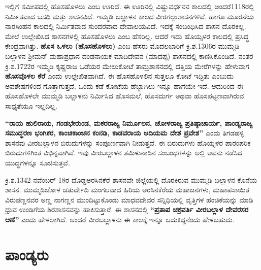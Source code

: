 ಇಲ್ಲಿಗೆ ಸಮೀಪದಲ್ಲಿ ಹೊಸಹೊಳಲು ಎಂಬ ಊರಿದೆ. ಈ ಊರಿನಲ್ಲಿ ವಿಷ್ಣುವರ್ಧನನ ಕಾಲದಲ್ಲಿ ಅಂದರೆ1118ರಲ್ಲಿ ನಿರ್ಮಿತವಾದ ಬಸದಿ ಮತ್ತು ಶಾಸನವಿದೆ. ಇಮ್ಮಡಿ ಬಲ್ಲಾಳನ ಕಾಲದ ವೀರಗಲ್ಲುಶಾಸನಗಳಿವೆ. ಹಾಗೂ ಮೂರನೆಯ ನಾರಸಿಂಹನ ಕಾಲದಲ್ಲಿ ನಿರ್ಮಿತವಾದ ಸುಂದರವಾದ ದೇವಾಲಯವಿದೆ. ಇದಕ್ಕೆ ಸಂಬಂಧಿಸಿದ ಶಾಸನ ದೊರಕಿಲ್ಲ. ಮೇಲೆ ಉಲ್ಲೇಖಿಸಿದ ಶಾಸನಗಳಲ್ಲಿ ಹೊಸಹೊಳಲು ಎಂಬ ಹೆಸರಿಲ್ಲ. ಆದರೆ ಇದು ಹೊಯ್ಸಳರ ಕಾಲದಲ್ಲಿ ಪ್ರಸಿದ್ಧ ಕೇಂದ್ರವಾಗಿತ್ತು. \textbf{ಹೊಸ ಒಳಲು (ಹೊಸಹೊಳಲು)} ಎಂಬ ಹೆಸರು ಮೊದಲಬಾರಿಗೆ ಕ್ರಿ.ಶ.1306ರ ಮುಮ್ಮಡಿ ಬಲ್ಲಾಳನ ಶ‍್ರೀಮನ್​ ಮಹಾಪ್ರಧಾನ ದಂಡನಾಯಕ ಮಾದಿದೇವನ (ಮಾದಪ್ಪ) ಶಾಸನದಲ್ಲಿ ಕಾಣಿಸಿಕೊಂಡಿದೆ. ನಂತರ ಕ್ರಿ.ಶ.1722ರ ಇಮ್ಮಡಿ ಕೃಷ್ಣರಾಜ ಒಡೆಯರ ಮೇಲುಕೋಟೆ ತಾಮ್ರಶಾಸನದಲ್ಲಿ ದತ್ತಿಯ ಮೇರೆಗಳನ್ನು ಹೇಳುವಾಗ \textbf{ಹೊಸವೊಳಲ ಕೆರೆ} ಎಂದು ಉಲ್ಲೇಖಿತವಾಗಿದೆ. ಈ ಹೊಸಹೊಳಲಿನ ಸುತ್ತಲೂ ಕೋಟೆ ಇದ್ದಿತು ಎಂಬುದು ಅವಶೇಷಗಳಿಂದ ಗೊತ್ತಾಗುತ್ತದೆ. ಒಂದು ಕಡೆ ಕೋಟೆಯ ಹೆಬ್ಬಾಗಿಲು ಇನ್ನೂ ಹಾಗೆಯೇ ಇದೆ. ಆದುರಿಂದ ಈ ಹೊಸಹೊಳಲೇ ಮುಮ್ಮಡಿ ಬಲ್ಲಾಳನು ನಿರ್ಮಿಸಿದ ಹೊಸಮಲೆ, ಹೊಸದುರ್ಗ ಅಥವಾ ಹೊಸಪಟ್ಟಣವಾಗಿರುವ ಸಾಧ್ಯತೆಯೂ ಇಲ್ಲದಿಲ್ಲ.

\textbf{“ರಾಯ ಹುಲಿರಾಯ, ಗಂಡಭೇರುಂಡ, ಮಕರರಾಜ್ಯ ನಿರ್ಮೂಲನ, ಚೋಳರಾಜ್ಯ ಪ್ರತಿಷ್ಠಾಚಾರ್ಯ,\general{\break } ಪಾಂಡ್ಯರಾಜ್ಯ ಸಮುದ್ಧರಣ ಭಂಗಿಕರ, ಕಾಂಚಿಕಾಂಚನ ಕಂನಡಿ, ಕಾಡವರಾಯ ಆದಿಯಮ ದೇಶ ಪ್ರವೇಶ”} ಎಂದು ತಿಗಡಹಳ್ಳಿ ಶಾಸನವು ವೀರಬಲ್ಲಾಳನ ಬಿರುದುಗಳನ್ನು ಸಂಪೂರ್ಣವಾಗಿ ನೀಡುತ್ತದೆ. ಈ ಬಿರುದುಗಳು ಹೊಯ್ಸಳರ ಪಾರಂಪರಿಕ ಬಿರುದುಗಳಿಗಿಂತ ವಿಭಿನ್ನವಾಗಿವೆ. ಇವು ವೀರಬಲ್ಲಾಳನ ತಮಿಳುನಾಡಿನ ಸಂಬಂಧಗಳನ್ನು ಅಲ್ಲಿ ಅವನು ನಡೆಸಿದ ಯುದ್ಧಗಳನ್ನೂ ಸೂಚಿಸುತ್ತವೆ.

ಕ್ರಿ.ಶ.1342 ನವೆಂಬರ್​ 18ರ ದೊಡ್ಡಅರಸಿನಕೆರೆ ಶಾಸನವೇ ಜಿಲ್ಲೆಯಲ್ಲಿ ದೊರಕಿರುವ ಮುಮ್ಮಡಿ ಬಲ್ಲಾಳನ ಕೊನೆಯ ಶಾಸನ. ಮುಮ್ಮಡಿಚೋಳ ಚತುರ್ವೇದಿ ಮಂಗಲವಾದ ಹಿರಿಯ ಅರಸಿನಕೆರೆಯ ಮಹಾಜನಗಳು, ಮಹಾಪಸಾಯಿತ ವಿರುಪಣ್ಣನವರ ಅಣ್ಣ ನಾಗಣ್ಣನ ಮುಂದಿಟ್ಟುಕೊಂಡು ಮಾಧವದೇವರ ಸನ್ನಿಧಿಯಲ್ಲಿ ವೃತ್ತಿಗಳ ಹಂಚಿಕೆಯನ್ನು ಮಾಡಿ ಧ್ರುವ ಉಂಡಿಗೆಯ ಶಿರಶಾಸನವನ್ನು ಹಾಕಿಸುತ್ತಾರೆ. ಈ ಶಾಸನದಲ್ಲಿ \textbf{“ಪ್ರತಾಪ ಚಕ್ರವರ್ತಿ ವೀರಬಲ್ಲಾಳ ದೇವರಸರ ಆಣೆ”} ಎಂದು ಹೇಳಲಾಗಿದೆ. ಅಂದರೆ ವೀರಬಲ್ಲಾಳನು ಈ ಕಾಲಕ್ಕೆ ಇನ್ನೂ ಬದುಕಿದ್ದನೆಂದು ಹೇಳಬಹುದು.


\section{ಪಾಂಡ್ಯರು}

